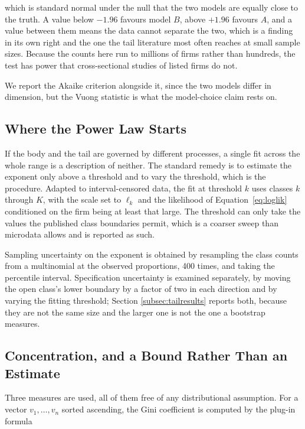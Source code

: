 \documentclass[jrfm,article,submit,pdftex,moreauthors]{Definitions/mdpi}
\begin{document}
which is standard normal under the null that the two models are equally close to the truth.
A value below $-1.96$ favours model $B$, above $+1.96$ favours $A$, and a value between them means the data cannot separate the two, which is a finding in
its own right and the one the tail literature most often reaches at small sample sizes. Because the counts here run to
millions of firms rather than hundreds, the test has power that cross-sectional studies of
listed firms do not.

We report the Akaike criterion alongside it, since the two models differ in dimension, but
the Vuong statistic is what the model-choice claim rests on.

\subsection{Where the Power Law Starts}
\label{subsec:tail}

If the body and the tail are governed by different processes, a single fit across the whole
range is a description of neither. The standard remedy is to estimate the exponent only
above a threshold and to vary the threshold, which is the \citet{ClausetShaliziNewman2009}
procedure. Adapted to interval-censored data, the fit at threshold $k$ uses classes $k$
through $K$, with the scale set to $\ell_k$ and the likelihood of
Equation~\eqref{eq:loglik} conditioned on the firm being at least that large. The threshold
can only take the values the published class boundaries permit, which is a coarser sweep than
microdata allows and is reported as such.

Sampling uncertainty on the exponent is obtained by resampling the class counts from a
multinomial at the observed proportions, 400 times, and taking the percentile interval.
Specification uncertainty is examined separately, by moving the open class's lower boundary
by a factor of two in each direction and by varying the fitting threshold; Section
\ref{subsec:tailresults} reports both, because they are not the same size and the larger one
is not the one a bootstrap measures.

\subsection{Concentration, and a Bound Rather Than an Estimate}
\label{subsec:concentration}

Three measures are used, all of them free of any distributional assumption. For a vector
$v_1,\dots,v_n$ sorted ascending, the Gini coefficient is computed by the plug-in formula
\end{document}
